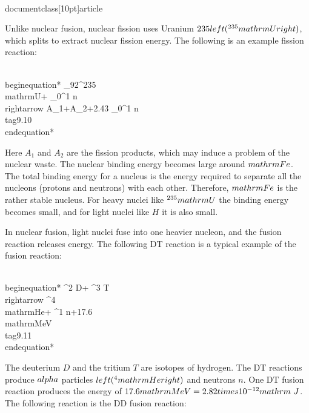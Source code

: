 \\documentclass[10pt]{article}
\begin{document}
{{{{{Unlike nuclear fusion, nuclear fission uses Uranium $235\\left({ }^{235} \\mathrm{U}\\right)$, which splits to extract nuclear fission energy. The following is an example fission reaction:


\\begin{equation*}
{ }_{92}^{235} \\mathrm{U}+{ }_{0}^{1} n \\rightarrow A_{1}+A_{2}+2.43{ }_{0}^{1} n \\tag{9.10}
\\end{equation*}


Here $A_{1}$ and $A_{2}$ are the fission products, which may induce a problem of the nuclear waste. The nuclear binding energy becomes large around $\\mathrm{Fe}$. The total binding energy for a nucleus is the energy required to separate all the nucleons (protons and neutrons) with each other. Therefore, $\\mathrm{Fe}$ is the rather stable nucleus. For heavy nuclei like ${ }^{235} \\mathrm{U}$ the binding energy becomes small, and for light nuclei like $H$ it is also small.

In nuclear fusion, light nuclei fuse into one heavier nucleon, and the fusion reaction releases energy. The following DT reaction is a typical example of the fusion reaction:


\\begin{equation*}
{ }^{2} D+{ }^{3} T \\rightarrow{ }^{4} \\mathrm{He}+{ }^{1} n+17.6 \\mathrm{MeV} \\tag{9.11}
\\end{equation*}


The deuterium $D$ and the tritium $T$ are isotopes of hydrogen. The DT reactions produce $\\alpha$ particles $\\left({ }^{4} \\mathrm{He}\\right)$ and neutrons $n$. One DT fusion reaction produces the energy of $17.6 \\mathrm{MeV}=2.82 \\times 10^{-12} \\mathrm{~J}$. The following reaction is the DD fusion reaction:

}}}}}
\end{document}
